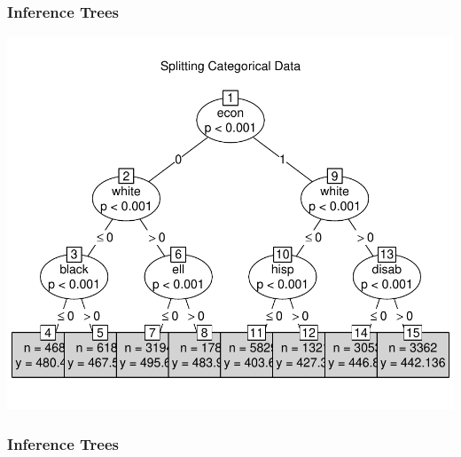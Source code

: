 \documentclass[12pt,handout]{beamer}
\begin{document}
\begin{frame}
\frametitle{Inference Trees}
\begin{center}
\vspace{-.1in}
\includegraphics[width=.8\textwidth]{classtree}
\end{center}
\end{frame}

{
\begin{frame}[plain]
\frametitle{Inference Trees}
\end{frame}
}
\end{document}
